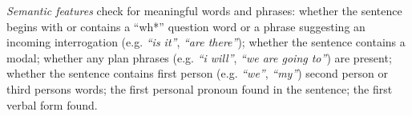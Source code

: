 \textit{Semantic features} check for meaningful words and phrases:
%
whether the sentence begins with or contains a ``wh*'' question word 
or a phrase %
suggesting an incoming interrogation (e.g. \textit{``is it''}, \textit{``are there''}); %
whether the sentence contains a modal; 
whether any plan phrases (e.g. \textit{``i will''}, \textit{``we are going to''}) are present;
whether the sentence contains first person (e.g. \textit{``we''}, \textit{``my''}) %
second person or third persons words; %
the first personal pronoun found in the sentence;
the first verbal form found.%

